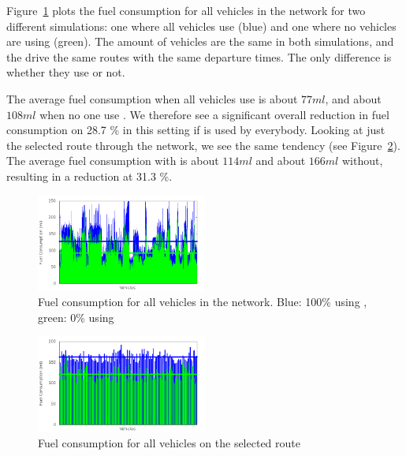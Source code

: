 Figure~\ref{fig:TestResults:fuelTotal} plots the fuel consumption for all vehicles in the network for two different simulations: one where all vehicles use \tech (blue) and one where no vehicles are using \tech (green).
The amount of vehicles are the same in both simulations, and the drive the same routes with the same departure times. 
The only difference is whether they use \tech or not.

The average fuel consumption when all vehicles use \tech is about $77 ml$, and about $108 ml$ when no one use \tech.
We therefore see a significant overall reduction in fuel consumption on 28.7 \% in this setting if \tech is used by everybody.
Looking at just the selected route through the network, we see the same tendency (see Figure~\ref{fig:TestResults:fuelRoute}). 
The average fuel consumption with \tech is about $114 ml$ and about $166 ml$ without, resulting in a reduction at 31.3 \%.
\begin{figure}[h]
\includegraphics[width=0.5\textwidth]{../images/tp0c1_0/fuelTotal.png}
\caption{Fuel consumption for all vehicles in the network. Blue: 100\% using \tech, green: 0\% using \tech}
\label{fig:TestResults:fuelTotal}
\end{figure}
\begin{figure}[h]
\includegraphics[width=0.5\textwidth]{../images/tp0c1_0/fuelRoute.png}
\caption{Fuel consumption for all vehicles on the selected route}
\label{fig:TestResults:fuelRoute}
\end{figure}


